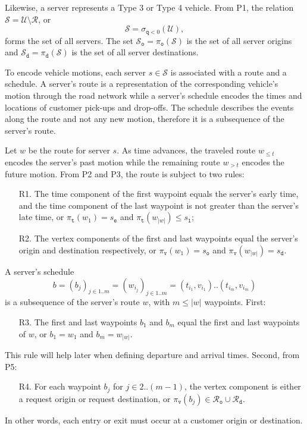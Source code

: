Likewise, a server represents a Type 3 or Type 4 vehicle.
From P1, the relation $\mathcal{S}=\mathcal{U}\setminus\mathcal{R}$, or
$$\mathcal{S}=\sigma_{\texttt{q}<0}(\mathcal{U}),$$
forms the set of all servers. The set
$\mathcal{S}_\texttt{o}=\pi_\texttt{o}(\mathcal{S})$ is the set of all server origins and
$\mathcal{S}_\texttt{d}=\pi_\texttt{d}(\mathcal{S})$ is the set of all server destinations.

To encode vehicle motions, each server $s\in\mathcal{S}$ is associated with a
route and a schedule.  A server's route is a representation of the corresponding
vehicle's motion through the road network while a server's schedule
encodes the times and locations of customer pick-ups and drop-offs.
The schedule describes the events along the route and not any new motion,
therefore it is a subsequence of the server's route.

Let $w$ be the route for server $s$. As time
advances, the traveled route $w_{\leq t}$ encodes the server's past
motion while the remaining route $w_{>t}$ encodes the future motion.
From P2 and P3, the route is subject to two rules:
\begin{enumerate}
\item[R1.] The time component of the first waypoint equals the server's early time,
  and the time component of the last waypoint is not greater than the server's late time,
  or $\pi_\texttt{t}(w_1)=s_\texttt{e}$ and $\pi_\texttt{t}(w_{|w|})\leq s_\texttt{l}$;
\item[R2.] The vertex components of the first and last waypoints equal the
  server's origin and destination respectively, or
  $\pi_\texttt{v}(w_1)=s_\texttt{o}$ and $\pi_\texttt{v}(w_{|w|})=s_\texttt{d}$.
\end{enumerate}

A server's schedule
$$b=(b_j)_{j\in 1..m}=(w_{i_j})_{j\in 1..m}=(t_{i_1},v_{i_1})..(t_{i_m},v_{i_m})$$
is a subsequence of the server's route $w$, with $m\leq |w|$ waypoints.
First:
\begin{enumerate}
\item[R3.] The first and last waypoints $b_1$ and $b_m$ equal the first and last
waypoints of $w$, or ${b_1=w_1}$ and ${b_m=w_{|w|}}$.
\end{enumerate}
This rule will help later when defining departure and arrival times.
Second, from P5:
\begin{enumerate}
\item[R4.] For each waypoint $b_j$ for $j\in 2..(m-1)$, the vertex component is either a
request origin or request destination, or $\pi_\texttt{v}(b_j)\in
\mathcal{R}_\texttt{o}\cup\mathcal{R}_\texttt{d}$.
\end{enumerate}
In other words, each entry or exit must occur at a customer origin or destination.

